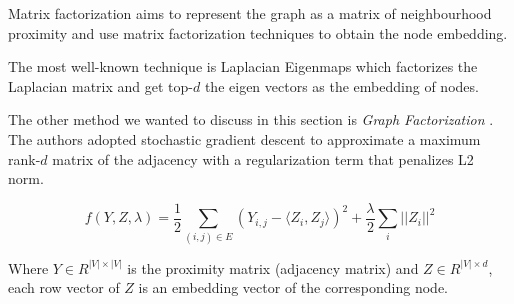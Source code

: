 Matrix factorization aims to represent the graph as a matrix of neighbourhood proximity and use matrix factorization techniques to obtain the node embedding.

The most well-known technique is Laplacian Eigenmaps which factorizes the Laplacian matrix and get top-$d$ the eigen vectors as the embedding of nodes. 

The other method we wanted to discuss in this section is \emph{Graph Factorization} \cite{ahmed2013distributed}. The authors adopted stochastic gradient descent to approximate a maximum rank-$d$ matrix of the adjacency with a regularization term that penalizes L2 norm.

\begin{equation}
    f(Y, Z, \lambda) = \frac{1}{2} \sum_{(i, j) \in E} (Y_{i, j} - \langle Z_i, Z_j \rangle)^2 + \frac{\lambda}{2} \sum_i ||Z_i||^2
\end{equation}

Where $Y \in R^{|V| \times |V|}$ is the proximity matrix (adjacency matrix) and $Z \in R^{|V| \times d}$, each row vector of $Z$ is an embedding vector of the corresponding node.